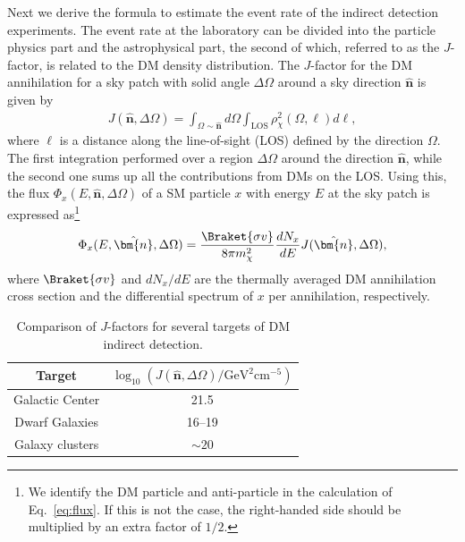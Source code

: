 \documentclass[12pt,twoside,book]{article}
\begin{document}
Next we derive the formula to estimate the event rate of the indirect detection experiments.
The event rate at the laboratory can be divided into the particle physics part and the astrophysical part, the second of which, referred to as the $J$-factor, is related to the DM density distribution.
The $J$-factor for the DM annihilation for a sky patch with solid angle $\Delta\Omega$ around a sky direction $\hat{\bm{n}}$ is given by
\begin{align}
  J(\hat{\bm{n}}, \Delta\Omega) = \int_{\Omega \sim \hat{\bm{n}}} d\Omega
  \int_{\mathrm{LOS}} \rho_\chi^2 (\Omega, \ell) d\ell,
  \label{eq:J-factor}
\end{align}
where $\ell$ is a distance along the line-of-sight (LOS) defined by the direction $\Omega$.
The first integration performed over a region $\Delta\Omega$ around the direction $\hat{\bm{n}}$, while the second one sums up all the contributions from DMs on the LOS.
Using this, the flux $\Phi_x(E, \hat{\bm{n}}, \Delta\Omega)$ of a SM particle $x$ with energy $E$ at the sky patch is expressed as\footnote{
  We identify the DM particle and anti-particle in the calculation of Eq.~\eqref{eq:flux}.
  If this is not the case, the right-handed side should be multiplied by an extra factor of $1/2$.
}
\begin{align}
  \Phi_x (E, \hat{\bm{n}}, \Delta\Omega) = \frac{\Braket{\sigma v}}{8\pi m_\chi^2}
  \frac{d N_x}{d E} J(\hat{\bm{n}}, \Delta\Omega),
  \label{eq:flux}
\end{align}
where $\Braket{\sigma v}$ and $d N_x / d E$ are the thermally averaged DM annihilation cross section and the differential spectrum of $x$ per annihilation, respectively.

\begin{table}[t]
  \centering
  \begin{tabular}{c|c}
    Target & $\log_{10} (J(\hat{\bm{n}}, \Delta\Omega) / \mathrm{GeV}^2 \mathrm{cm}^{-5})$ \\ \hline
    Galactic Center & 21.5\\
    Dwarf Galaxies & 16--19\\
    Galaxy clusters & $\sim 20$
  \end{tabular}
  \caption{Comparison of $J$-factors for several targets of DM indirect detection.}
  \label{tab:J-factors}
\end{table}
\end{document}
